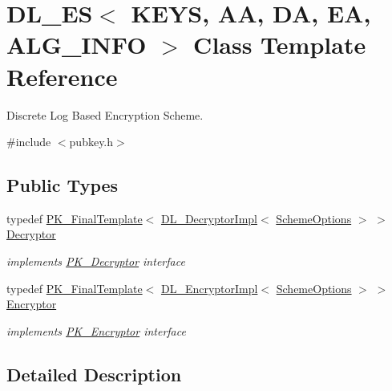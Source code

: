 \hypertarget{class_d_l___e_s}{
\section{DL\_\-ES$<$ KEYS, AA, DA, EA, ALG\_\-INFO $>$ Class Template Reference}
\label{class_d_l___e_s}
}


Discrete Log Based Encryption Scheme.  


{\ttfamily \#include $<$pubkey.h$>$}\subsection*{Public Types}
\begin{DoxyCompactItemize}
\item 
\hypertarget{class_d_l___e_s_a6f4960dec76bc05d9c720c9b903e2a79}{
typedef \hyperlink{class_p_k___final_template}{PK\_\-FinalTemplate}$<$ \hyperlink{class_d_l___decryptor_impl}{DL\_\-DecryptorImpl}$<$ \hyperlink{struct_d_l___crypto_scheme_options}{SchemeOptions} $>$ $>$ \hyperlink{class_d_l___e_s_a6f4960dec76bc05d9c720c9b903e2a79}{Decryptor}}
\label{class_d_l___e_s_a6f4960dec76bc05d9c720c9b903e2a79}

\begin{DoxyCompactList}\small\item\em implements \hyperlink{class_p_k___decryptor}{PK\_\-Decryptor} interface \item\end{DoxyCompactList}\item 
\hypertarget{class_d_l___e_s_ae0f5a08f99a0ff49d52a4400c58bde76}{
typedef \hyperlink{class_p_k___final_template}{PK\_\-FinalTemplate}$<$ \hyperlink{class_d_l___encryptor_impl}{DL\_\-EncryptorImpl}$<$ \hyperlink{struct_d_l___crypto_scheme_options}{SchemeOptions} $>$ $>$ \hyperlink{class_d_l___e_s_ae0f5a08f99a0ff49d52a4400c58bde76}{Encryptor}}
\label{class_d_l___e_s_ae0f5a08f99a0ff49d52a4400c58bde76}

\begin{DoxyCompactList}\small\item\em implements \hyperlink{class_p_k___encryptor}{PK\_\-Encryptor} interface \item\end{DoxyCompactList}\end{DoxyCompactItemize}


\subsection{Detailed Description}
